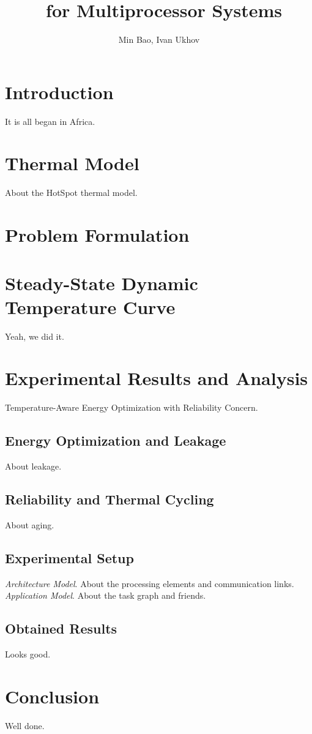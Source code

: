 \documentclass[11pt,a4paper]{article}
\author{Min Bao, Ivan Ukhov}
\title{\ssdtc\ for Multiprocessor Systems}
\newcommand{\ssdtc}{Steady-State Dynamic Temperature Curve}
\begin{document}
\maketitle
\section{Introduction}
It is all began in Africa.

\section{Thermal Model}
About the HotSpot thermal model.

\section{Problem Formulation}

\section{\ssdtc}
Yeah, we did it.

\section{Experimental Results and Analysis}
Temperature-Aware Energy Optimization with Reliability Concern.

\subsection{Energy Optimization and Leakage}
About leakage.

\subsection{Reliability and Thermal Cycling}
About aging.

\subsection{Experimental Setup}
\emph{Architecture Model}. About the processing elements and communication links.\\
\emph{Application Model}. About the task graph and friends.

\subsection{Obtained Results}
Looks good.

\section{Conclusion}
Well done.
\end{document}
